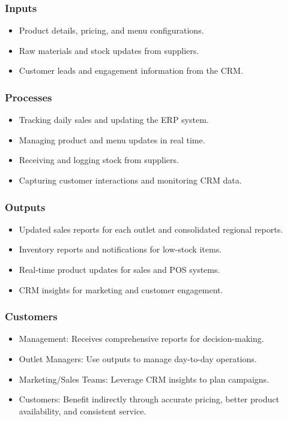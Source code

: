 \subsubsection*{Inputs}
\begin{itemize}
    \item Product details, pricing, and menu configurations.
    \item Raw materials and stock updates from suppliers.
    \item Customer leads and engagement information from the CRM.
\end{itemize}

\subsubsection*{Processes}
\begin{itemize}
    \item Tracking daily sales and updating the ERP system.
    \item Managing product and menu updates in real time.
    \item Receiving and logging stock from suppliers.
    \item Capturing customer interactions and monitoring CRM data.
\end{itemize}

\subsubsection*{Outputs}
\begin{itemize}
    \item Updated sales reports for each outlet and consolidated regional reports.
    \item Inventory reports and notifications for low-stock items.
    \item Real-time product updates for sales and POS systems.
    \item CRM insights for marketing and customer engagement.
\end{itemize}

\subsubsection*{Customers}
\begin{itemize}
    \item Management: Receives comprehensive reports for decision-making.
    \item Outlet Managers: Use outputs to manage day-to-day operations.
    \item Marketing/Sales Teams: Leverage CRM insights to plan campaigns.
    \item Customers: Benefit indirectly through accurate pricing, better product availability, and consistent service.
\end{itemize}

